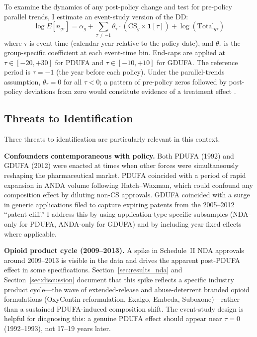 To examine the dynamics of any post-policy change and test for pre-policy parallel trends, I estimate an event-study version of the DD:
\begin{equation}
\label{eq:eventstudy}
\log E[n_{g\tau}] = \alpha_g + \sum_{\tau \neq -1} \theta_\tau \cdot (\text{CS}_g \times \mathbf{1}[\tau]) + \log(\text{Total}_{g\tau})
\end{equation}
where $\tau$ is event time (calendar year relative to the policy date), and $\theta_\tau$ is the group-specific coefficient at each event-time bin. End-caps are applied at $\tau \in [-20, +30]$ for PDUFA and $\tau \in [-10, +10]$ for GDUFA. The reference period is $\tau = -1$ (the year before each policy). Under the parallel-trends assumption, $\theta_\tau = 0$ for all $\tau < 0$; a pattern of pre-policy zeros followed by post-policy deviations from zero would constitute evidence of a treatment effect \parencite{millerIntroductoryGuideEvent2023}.

\subsection{Threats to Identification}

Three threats to identification are particularly relevant in this context.

\textbf{Confounders contemporaneous with policy.} Both PDUFA (1992) and GDUFA (2012) were enacted at times when other forces were simultaneously reshaping the pharmaceutical market. PDUFA coincided with a period of rapid expansion in ANDA volume following Hatch--Waxman, which could confound any composition effect by diluting non-CS approvals. GDUFA coincided with a surge in generic applications filed to capture expiring patents from the 2005--2012 ``patent cliff.'' I address this by using application-type-specific subsamples (NDA-only for PDUFA, ANDA-only for GDUFA) and by including year fixed effects where applicable.

\textbf{Opioid product cycle (2009--2013).} A spike in Schedule~II NDA approvals around 2009--2013 is visible in the data and drives the apparent post-PDUFA effect in some specifications. Section~\ref{sec:results_nda} and Section~\ref{sec:discussion} document that this spike reflects a specific industry product cycle---the wave of extended-release and abuse-deterrent branded opioid formulations (OxyContin reformulation, Exalgo, Embeda, Suboxone)---rather than a sustained PDUFA-induced composition shift. The event-study design is helpful for diagnosing this: a genuine PDUFA effect should appear near $\tau = 0$ (1992--1993), not 17--19 years later.

